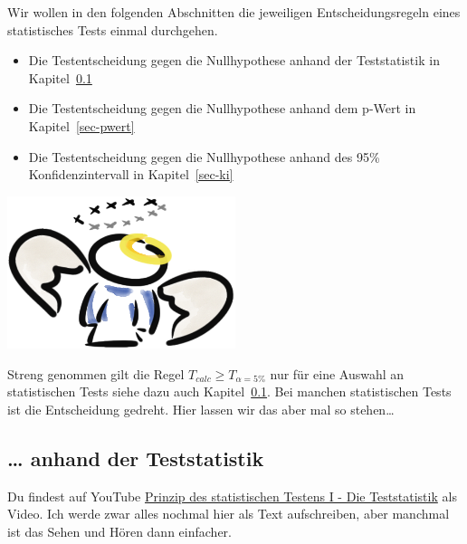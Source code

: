 \documentclass[
  letterpaper,
]{scrbook}
\providecommand{\tightlist}{%
  \setlength{\itemsep}{0pt}\setlength{\parskip}{0pt}}\usepackage{longtable,booktabs,array}
\begin{document}
Wir wollen in den folgenden Abschnitten die jeweiligen
Entscheidungsregeln eines statistisches Tests einmal durchgehen.

\begin{itemize}
\tightlist
\item
  Die Testentscheidung gegen die Nullhypothese anhand der Teststatistik
  in Kapitel~\ref{sec-teststatistik}
\item
  Die Testentscheidung gegen die Nullhypothese anhand dem p-Wert in
  Kapitel~\ref{sec-pwert}
\item
  Die Testentscheidung gegen die Nullhypothese anhand des 95\%
  Konfidenzintervall in Kapitel~\ref{sec-ki}
\end{itemize}

\begin{marginfigure}

{\centering \includegraphics[width=0.5\textwidth,height=\textheight]{./images/angel_01.png}

}

\end{marginfigure}

Streng genommen gilt die Regel \(T_{calc} \geq T_{\alpha = 5\%}\) nur
für eine Auswahl an statistischen Tests siehe dazu auch
Kapitel~\ref{sec-teststatistik}. Bei manchen statistischen Tests ist die
Entscheidung gedreht. Hier lassen wir das aber mal so stehen\ldots{}

\hypertarget{sec-teststatistik}{%
\subsection{\ldots{} anhand der Teststatistik}\label{sec-teststatistik}}

\begin{tcolorbox}[enhanced jigsaw, coltitle=black, titlerule=0mm, bottomrule=.15mm, opacityback=0, opacitybacktitle=0.6, leftrule=.75mm, title=\textcolor{quarto-callout-tip-color}{\faLightbulb}\hspace{0.5em}{Prinzip des statistischen Testens I - Die Teststatistik}, toprule=.15mm, bottomtitle=1mm, toptitle=1mm, left=2mm, breakable, arc=.35mm, colback=white, rightrule=.15mm, colbacktitle=quarto-callout-tip-color!10!white, colframe=quarto-callout-tip-color-frame]
Du findest auf YouTube \href{https://youtu.be/28QjGfR_SPQ}{Prinzip des
statistischen Testens I - Die Teststatistik} als Video. Ich werde zwar
alles nochmal hier als Text aufschreiben, aber manchmal ist das Sehen
und Hören dann einfacher.
\end{tcolorbox}
\end{document}
